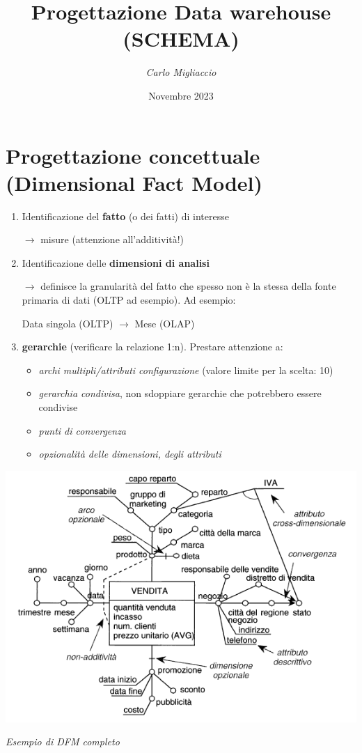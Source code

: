 \documentclass[12pt]{article}
\begin{document}
\title{\textbf{Progettazione Data warehouse (SCHEMA)}}
\author{\textit{Carlo Migliaccio}}
\date{Novembre 2023}
\maketitle

\section{Progettazione concettuale (Dimensional Fact Model)}
\begin{enumerate}
    \item Identificazione del \textbf{fatto} (o dei fatti) di interesse
        
        $\rightarrow$ misure (attenzione all'additività!)
    \item Identificazione delle \textbf{dimensioni di analisi}

    $\rightarrow$ definisce la granularità del fatto che spesso non è la stessa della fonte primaria di dati (OLTP ad esempio). Ad esempio: 
    
    Data singola (OLTP) $\rightarrow$ Mese (OLAP)
    \item \textbf{gerarchie} (verificare la relazione 1:n). Prestare attenzione a:
        \begin{itemize}
            \item \textit{archi multipli/attributi configurazione }(valore limite per la scelta: 10)
            \item \textit{gerarchia condivisa}, non sdoppiare gerarchie che potrebbero essere condivise
            \item \textit{punti di convergenza}
            \item \textit{opzionalità delle dimensioni, degli attributi}
        \end{itemize}

        
 \end{enumerate}

\begin{center}
    \centering
    \includegraphics[width=0.8\linewidth]{dfm2.PNG}

    \textit{Esempio di DFM completo}
\end{center}
\end{document}
